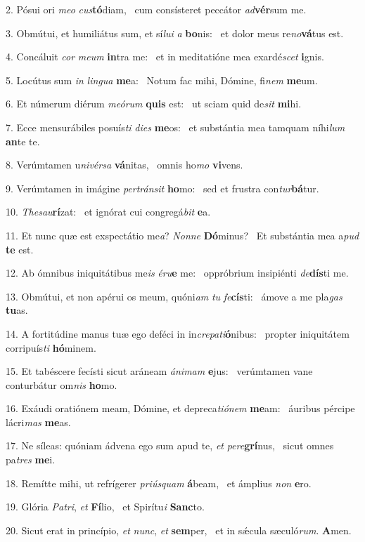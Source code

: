 2. Pósui ori \textit{me}\textit{o} \textit{cus}\textbf{tó}diam, \ast\  cum consísteret peccátor \textit{ad}\textbf{vér}sum me.\

3. Obmútui, et humiliátus sum, et sí\textit{lu}\textit{i} \textit{a} \textbf{bo}nis: \ast\  et dolor meus re\textit{no}\textbf{vá}tus est.\

4. Concáluit \textit{cor} \textit{me}\textit{um} \textbf{in}tra me: \ast\  et in meditatióne mea exardé\textit{scet} \textbf{i}gnis.\

5. Locútus sum \textit{in} \textit{lin}\textit{gua} \textbf{me}a: \ast\  Notum fac mihi, Dómine, fi\textit{nem} \textbf{me}um.\

6. Et númerum diérum \textit{me}\textit{ó}\textit{rum} \textbf{quis} est: \ast\  ut sciam quid de\textit{sit} \textbf{mi}hi.\

7. Ecce mensurábiles posuís\textit{ti} \textit{di}\textit{es} \textbf{me}os: \ast\  et substántia mea tamquam níhi\textit{lum} \textbf{an}te te.\

8. Verúmtamen u\textit{ni}\textit{vér}\textit{sa} \textbf{vá}nitas, \ast\  omnis ho\textit{mo} \textbf{vi}vens.\

9. Verúmtamen in imágine \textit{per}\textit{tráns}\textit{it} \textbf{ho}mo: \ast\  sed et frustra con\textit{tur}\textbf{bá}tur.\

10. \textit{The}\textit{sau}\textbf{rí}zat: \ast\  et ignórat cui congregá\textit{bit} \textbf{e}a.\

11. Et nunc quæ est exspectátio me\textit{a}? \textit{Non}\textit{ne} \textbf{Dó}minus? \ast\  Et substántia mea a\textit{pud} \textbf{te} est.\

12. Ab ómnibus iniquitátibus me\textit{is} \textit{é}\textit{ru}\textbf{e} me: \ast\  oppróbrium insipiénti \textit{de}\textbf{dís}ti me.\

13. Obmútui, et non apérui os meum, quóni\textit{am} \textit{tu} \textit{fe}\textbf{cís}ti: \ast\  ámove a me pla\textit{gas} \textbf{tu}as.\

14. A fortitúdine manus tuæ ego deféci in in\textit{cre}\textit{pa}\textit{ti}\textbf{ó}nibus: \ast\  propter iniquitátem corripuís\textit{ti} \textbf{hó}minem.\

15. Et tabéscere fecísti sicut aráneam \textit{á}\textit{ni}\textit{mam} \textbf{e}jus: \ast\  verúmtamen vane conturbátur om\textit{nis} \textbf{ho}mo.\

16. Exáudi oratiónem meam, Dómine, et depreca\textit{ti}\textit{ó}\textit{nem} \textbf{me}am: \ast\  áuribus pércipe lácri\textit{mas} \textbf{me}as.\

17. Ne síleas: quóniam ádvena ego sum apud te, \textit{et} \textit{per}\textit{e}\textbf{grí}nus, \ast\  sicut omnes pa\textit{tres} \textbf{me}i.\

18. Remítte mihi, ut refrígerer \textit{pri}\textit{ús}\textit{quam} \textbf{á}beam, \ast\  et ámplius \textit{non} \textbf{e}ro.\

19. Glória \textit{Pa}\textit{tri}, \textit{et} \textbf{Fí}lio, \ast\  et Spirítu\textit{i} \textbf{Sanc}to.\

20. Sicut erat in princípio, \textit{et} \textit{nunc}, \textit{et} \textbf{sem}per, \ast\  et in sǽcula sæculó\textit{rum}. \textbf{A}men.\

